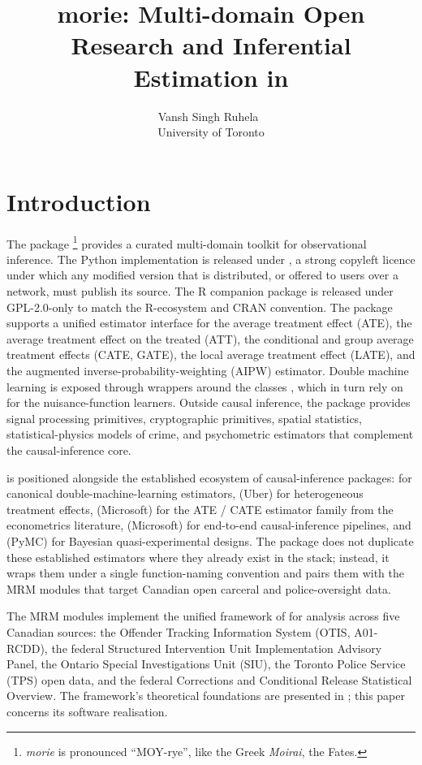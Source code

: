 \documentclass[article,shortnames,nojss]{jss}
\title{morie: Multi-domain Open Research and Inferential Estimation in \proglang{Python}}
\author{Vansh Singh Ruhela~\orcidlink{0009-0004-1750-3592}\\University of Toronto}
\newcommand{\OTIS}{\textsf{OTIS}}
\newcommand{\SIU}{\textsf{SIU}}
\newcommand{\TPS}{\textsf{TPS}}
\begin{document}
\sloppy

\section{Introduction}
\label{sec:intro}

The  package \footnote{\textit{morie} is
pronounced ``MOY-rye'', like the Greek \textit{Moirai},
the Fates.} provides a curated
multi-domain toolkit for observational inference. The Python
implementation is released under , a
strong copyleft licence under which any modified version that is
distributed, or offered to users over a network, must publish its
source.  The R companion
package \citep{Ruhela2026MorieR} is released under
GPL-2.0-only to match the R-ecosystem and CRAN convention.  The
package supports a
unified estimator interface for the average treatment effect
(ATE), the average treatment effect on the treated (ATT), the
conditional and group average treatment effects (CATE, GATE), the
local average treatment effect (LATE), and the augmented
inverse-probability-weighting (AIPW) estimator. Double machine
learning is exposed through wrappers around the 
classes \citep{Bach2022DoubleMLpy, Bach2024DoubleML}, which in
turn rely on  \citep{Pedregosa2011} for the
nuisance-function learners. Outside causal inference, the package
provides signal processing primitives, cryptographic primitives,
spatial statistics, statistical-physics models of crime, and
psychometric estimators that complement the causal-inference core.

 is positioned alongside the established
 ecosystem of causal-inference packages:
 \citep{Bach2022DoubleMLpy} for canonical
double-machine-learning estimators,  (Uber) for
heterogeneous treatment effects,  (Microsoft) for the
ATE / CATE estimator family from the econometrics literature,
 (Microsoft) for end-to-end causal-inference
pipelines, and  (PyMC) for Bayesian
quasi-experimental designs. The package does not duplicate these
established estimators where they already exist in the
 stack; instead, it wraps them under a single
function-naming convention and pairs them with the MRM modules
that target Canadian open carceral and police-oversight data.

The MRM modules implement the unified framework of
\citet{Ruhela2026MRM} for analysis across five Canadian sources:
the Offender Tracking Information System (\OTIS, A01-RCDD), the
federal Structured Intervention Unit Implementation Advisory
Panel, the Ontario Special Investigations Unit (\SIU), the
Toronto Police Service (\TPS) open data, and the federal
Corrections and Conditional Release Statistical Overview. The
framework's theoretical foundations are presented in
\citet{Ruhela2026MRM}; this paper concerns its 
software realisation.
\end{document}
